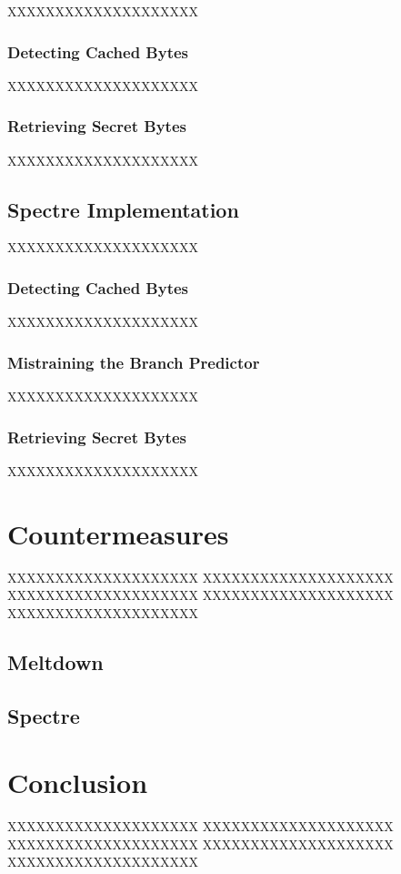 \documentclass[a4paper,oneside,openright] {scrreprt}
\begin{document}
XXXXXXXXXXXXXXXXXXXX

\subsection{Detecting Cached Bytes}
\label{ch:intro:motivation:A}

XXXXXXXXXXXXXXXXXXXX

\subsection{Retrieving Secret Bytes}
\label{ch:intro:motivation:A}

XXXXXXXXXXXXXXXXXXXX

\section{Spectre Implementation}
\label{ch:intro:motivation}

XXXXXXXXXXXXXXXXXXXX

\subsection{Detecting Cached Bytes}
\label{ch:intro:motivation:A}

XXXXXXXXXXXXXXXXXXXX

\subsection{Mistraining the Branch Predictor}
\label{ch:intro:motivation:A}

XXXXXXXXXXXXXXXXXXXX

\subsection{Retrieving Secret Bytes}
\label{ch:intro:motivation:A}

XXXXXXXXXXXXXXXXXXXX

\chapter{Countermeasures}
\label{ch:countermeasures}

XXXXXXXXXXXXXXXXXXXX
XXXXXXXXXXXXXXXXXXXX
XXXXXXXXXXXXXXXXXXXX
XXXXXXXXXXXXXXXXXXXX
XXXXXXXXXXXXXXXXXXXX

\section{Meltdown}
\label{ch:intro:motivation}

\section{Spectre}
\label{ch:intro:motivation}


\chapter{Conclusion}
\label{ch:conclusion}

XXXXXXXXXXXXXXXXXXXX
XXXXXXXXXXXXXXXXXXXX
XXXXXXXXXXXXXXXXXXXX
XXXXXXXXXXXXXXXXXXXX
XXXXXXXXXXXXXXXXXXXX



\end{document}
